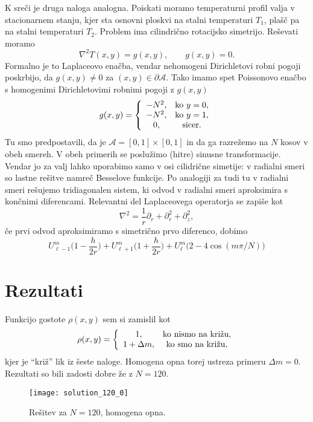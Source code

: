 \documentclass[a4 paper, 12pt]{article}
\begin{document}
K sre\v ci je druga naloga analogna. Poiskati moramo temperaturni profil valja v stacionarnem stanju,
kjer sta osnovni ploskvi na stalni temperaturi $T_1$, pla\v s\v c pa na stalni temperaturi $T_2$. Problem
ima cilindri\v cno rotacijsko simetrijo. Re\v sevati moramo
\[
	\nabla^2 T (x,y) = g(x,y), \qquad g(x,y) = 0.
\]
Formalno je to Laplaceovo ena\v cba, vendar nehomogeni Dirichletovi robni pogoji poskrbijo, da
$g(x,y) \neq 0$ za $(x,y) \in \partial \mathcal{A}$. Tako imamo spet Poissonovo ena\v cbo s homogenimi
Dirichletovimi robnimi pogoji z $g (x,y)$
\[
	g(x,y) = \left\{\begin{array}{c c}
			-N^2, & \text{ko\ } y = 0, \\
			-N^2, & \text{ko\ } y = 1, \\
			0, & \text{sicer.}
		\end{array}
		\right.
\]
Tu smo predpostavili, da je $\mathcal{A} = [0,1] \times [0,1]$ in da ga razre\v zemo na $N$ kosov
v obeh smereh. V obeh primerih se poslu\v zimo (hitre) sinusne transformacije. Vendar jo za valj
lahko uporabimo samo v osi cilidri\v cne simetije: v radialni smeri so lastne re\v sitve namre\v c
Besselove funkcije. Po analogiji za tudi tu v radialni smeri re\v sujemo tridiagonalen sistem,
ki odvod v radialni smeri aproksimira s kon\v cnimi diferencami. Relevantni del Laplaceovega
operatorja se zapi\v se kot
\[
    \nabla^2 = \frac{1}{r} \partial_r + \partial_r^2 + \partial_z^2,
\]
\v ce prvi odvod aproksimiramo s simetri\v cno prvo diferenco, dobimo
\[
    U^m_{\ell - 1}\bigg(1 - \frac{h}{2r}\bigg) + U^m_{\ell + 1}\bigg(1 + \frac{h}{2r}\bigg) +
        U^m_\ell \big(2 - 4\cos(m\pi/N)\big)
\]

\section{Rezultati}

Funkcijo gostote $\rho (x,y)$ sem si zamislil kot
\[
    \rho (x,y) = \left\{\begin{array}{c c}
            1, & \text{ko nismo na kri\v zu}, \\
            1 + \Delta m, & \text{ko smo na kri\v zu},
        \end{array}
        \right.
\]
kjer je "`kri\v z"' lik iz \v seste naloge. Homogena opna torej ustreza primeru $\Delta m = 0$.
Rezultati so bili zadosti dobre \v ze z $N = 120$.

\begin{figure}[H]\centering
    \texttt{[image: solution\_120\_0]}
    \vspace{-32pt}
    \caption{Re\v sitev za $N = 120$, homogena opna.}
    \vspace{-20pt}
\end{figure}
\end{document}
